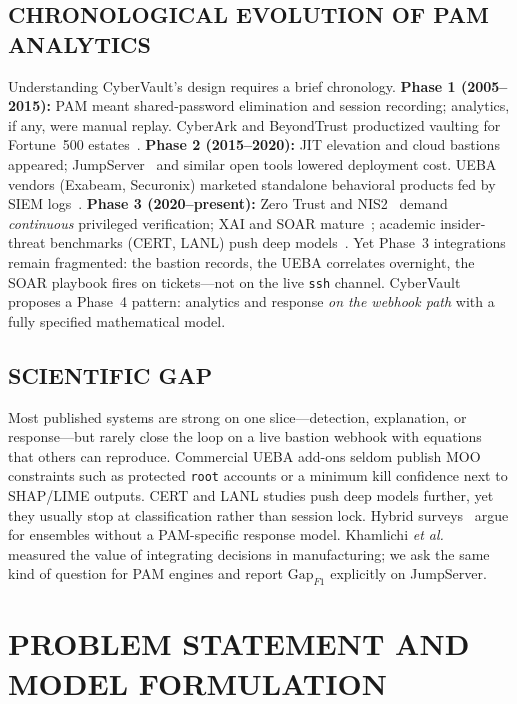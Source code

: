 \documentclass{ieeeaccess}
\begin{document}
\subsection{CHRONOLOGICAL EVOLUTION OF PAM ANALYTICS}
Understanding CyberVault's design requires a brief chronology. \textbf{Phase 1 (2005--2015):} PAM meant shared-password elimination and session recording; analytics, if any, were manual replay. CyberArk and BeyondTrust productized vaulting for Fortune~500 estates~\cite{ref16,ref17}. \textbf{Phase 2 (2015--2020):} JIT elevation and cloud bastions appeared; JumpServer~\cite{ref5} and similar open tools lowered deployment cost. UEBA vendors (Exabeam, Securonix) marketed standalone behavioral products fed by SIEM logs~\cite{ref2,ref27}. \textbf{Phase 3 (2020--present):} Zero Trust and NIS2~\cite{ref28,ref29} demand \textit{continuous} privileged verification; XAI and SOAR mature~\cite{ref12,ref13,ref15}; academic insider-threat benchmarks (CERT, LANL) push deep models~\cite{ref10,ref23}. Yet Phase~3 integrations remain fragmented: the bastion records, the UEBA correlates overnight, the SOAR playbook fires on tickets---not on the live \texttt{ssh} channel. CyberVault proposes a Phase~4 pattern: analytics and response \textit{on the webhook path} with a fully specified mathematical model.

\subsection{SCIENTIFIC GAP}
Most published systems are strong on one slice---detection, explanation, or response---but rarely close the loop on a live bastion webhook with equations that others can reproduce. Commercial UEBA add-ons seldom publish MOO constraints such as protected \texttt{root} accounts or a minimum kill confidence next to SHAP/LIME outputs. CERT and LANL studies push deep models further, yet they usually stop at classification rather than session lock. Hybrid surveys~\cite{ref11,ref24} argue for ensembles without a PAM-specific response model. Khamlichi \textit{et al.}~\cite{ref14} measured the value of integrating decisions in manufacturing; we ask the same kind of question for PAM engines and report $\mathrm{Gap}_{F1}$ explicitly on JumpServer.

\section{PROBLEM STATEMENT AND MODEL FORMULATION}
\label{sec:formulation}
\end{document}
